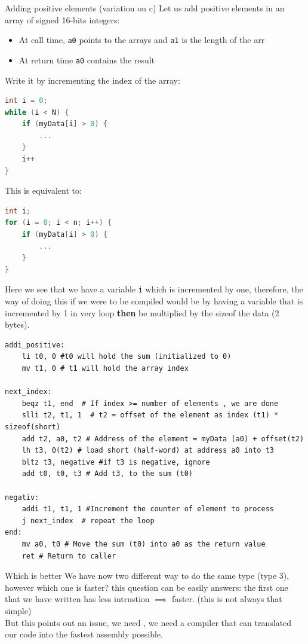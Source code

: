 \begin{parag}{Adding positive elements (variation on c)}
	Let us add positive elements in an array of signed 16-bits integers:
	\begin{itemize}
	    \item At call time, \texttt{a0} points to the arrays and \texttt{a1} is the length of the arr
	    \item At return time \texttt{a0} contains the result
	\end{itemize}
	Write it by incrementing the index of the array:\\
	\begin{lstlisting}[language=c]
int i = 0;
while (i < N) {
	if (myData[i] > 0) {
		...
	}
	i++
}
	\end{lstlisting}
	This is equivalent to:
	\begin{lstlisting}[language=c]
int i;
for (i = 0; i < n; i++) {
	if (myData[i] > 0) {
		...
	}
}
	\end{lstlisting}
	
	Here we see that we have a variable \texttt{i}  which is incremented by one, therefore, the way of doing this if we were to be compiled would be by having a variable that is incremented by 1 in very loop \textbf{then} be multiplied by the sizeof the data (2 bytes).
	\begin{lstlisting}[language={[RISC-V]Assembler}]
addi_positive:
	li t0, 0 #t0 will hold the sum (initialized to 0)
	mv t1, 0 # t1 will hold the array index

next_index:
	beqz t1, end  # If index >= number of elements , we are done
	slli t2, t1, 1  # t2 = offset of the element as index (t1) * sizeof(short)
	add t2, a0, t2 # Address of the element = myData (a0) + offset(t2)
	lh t3, 0(t2) # load short (half-word) at address a0 into t3
	bltz t3, negative #if t3 is negative, ignore
	add t0, t0, t3 # Add t3, to the sum (t0)

negativ:
	addi t1, t1, 1 #Increment the counter of element to process
	j next_index  # repeat the loop
end:
	mv a0, t0 # Move the sum (t0) into a0 as the return value
	ret # Return to caller
	\end{lstlisting}
	
	\begin{subparag}{Which is better}
	    We have now two different way to do the same type (type 3), however which one is faster? this question can be easily answers: the first one that we have written has less intrustion $\implies$ faster. (this is not always that simple)\\
		But this points out an issue, we need , we need a compiler that can translated our code into the fastest assembly possible.
	\end{subparag}
\end{parag}


